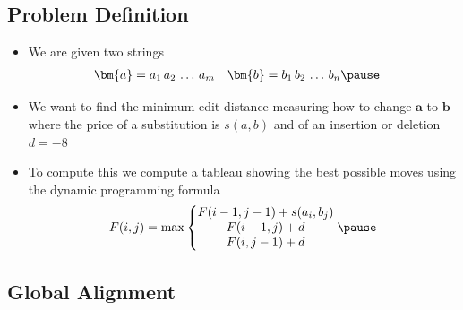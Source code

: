 
\begin{slide}
\section[-2]{Problem Definition}

\begin{PauseHighLight}
  \begin{itemize}
  \item We are given two strings
    \begin{align*}
      \bm{a} &= a_1\,a_2\,\ldots\,a_m &
      \bm{b} &= b_1\,b_2\,\ldots\,b_n\pause
    \end{align*}
  \item We want to find the minimum edit distance measuring how to
    change $\bm{a}$ to $\bm{b}$ where the price of a substitution is
    $s(a,b)$ and of an insertion or deletion $d=-8$\pause
  \item To compute this we compute a tableau showing the best possible
    moves using the dynamic programming formula\pause
    \begin{align*}
      F(i,j) = \max \left\{
      \begin{matrix}
        F(i-1,j-1) + s(a_i, b_j)\\
        F(i-1,j) + d\\
        F(i,j-1) + d
      \end{matrix}\right.\pause
    \end{align*}
  \end{itemize}
\end{PauseHighLight}

\end{slide}


\begin{slide}
\section[-2]{Global Alignment}
\pause
\pb
{}
\begin{center}
  \pause
\end{center}
\end{slide}


